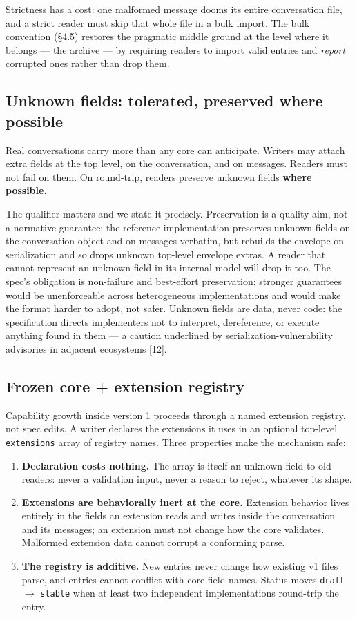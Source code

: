 \documentclass[11pt]{article}
\begin{document}
Strictness has a cost: one malformed message dooms its entire conversation file, and a strict reader must skip that whole file in a bulk import. The bulk convention (\S4.5) restores the pragmatic middle ground at the level where it belongs --- the archive --- by requiring readers to import valid entries and \emph{report} corrupted ones rather than drop them.

\subsection{Unknown fields: tolerated, preserved where possible}

Real conversations carry more than any core can anticipate. Writers may attach extra fields at the top level, on the conversation, and on messages. Readers must not fail on them. On round-trip, readers preserve unknown fields \textbf{where possible}.

The qualifier matters and we state it precisely. Preservation is a quality aim, not a normative guarantee: the reference implementation preserves unknown fields on the conversation object and on messages verbatim, but rebuilds the envelope on serialization and so drops unknown top-level envelope extras. A reader that cannot represent an unknown field in its internal model will drop it too. The spec's obligation is non-failure and best-effort preservation; stronger guarantees would be unenforceable across heterogeneous implementations and would make the format harder to adopt, not safer. Unknown fields are data, never code: the specification directs implementers not to interpret, dereference, or execute anything found in them --- a caution underlined by serialization-vulnerability advisories in adjacent ecosystems [12].

\subsection{Frozen core + extension registry}

Capability growth inside version 1 proceeds through a named extension registry, not spec edits. A writer declares the extensions it uses in an optional top-level \texttt{extensions} array of registry names. Three properties make the mechanism safe:

\begin{enumerate}
\item \textbf{Declaration costs nothing.} The array is itself an unknown field to old readers: never a validation input, never a reason to reject, whatever its shape.
\item \textbf{Extensions are behaviorally inert at the core.} Extension behavior lives entirely in the fields an extension reads and writes inside the conversation and its messages; an extension must not change how the core validates. Malformed extension data cannot corrupt a conforming parse.
\item \textbf{The registry is additive.} New entries never change how existing v1 files parse, and entries cannot conflict with core field names. Status moves \texttt{draft} $\rightarrow$ \texttt{stable} when at least two independent implementations round-trip the entry.
\end{enumerate}
\end{document}
